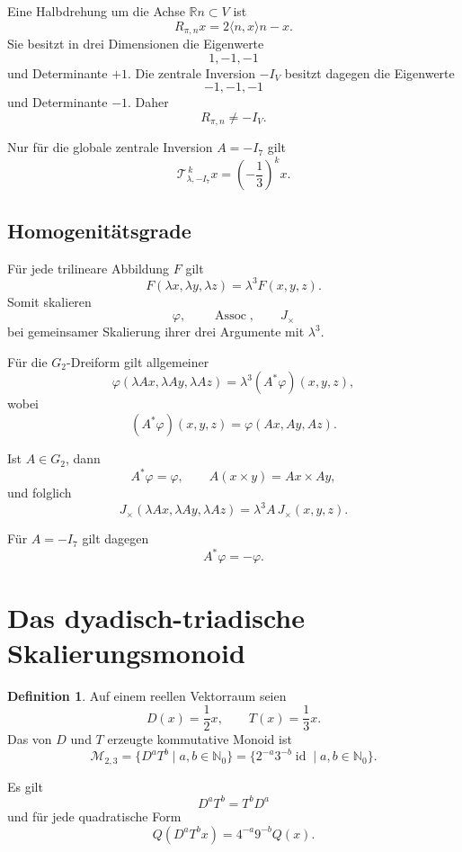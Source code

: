 \documentclass[11pt,a4paper]{article}
\theoremstyle{definition}
\newtheorem{definition}[theorem]{Definition}
\newcommand{\Assoc}{\operatorname{Assoc}}
\newcommand{\MtwoThree}{\mathcal M_{2,3}}
\newcommand{\R}{\mathbb R}
\newcommand{\Nzero}{\mathbb N_0}
\newcommand{\id}{\operatorname{id}}
\begin{document}
Eine Halbdrehung um die Achse $\R n\subset V$ ist
\[
R_{\pi,n}x
=
2\langle n,x\rangle n-x.
\]
Sie besitzt in drei Dimensionen die Eigenwerte
\[
1,-1,-1
\]
und Determinante $+1$. Die zentrale Inversion $-I_V$ besitzt dagegen die Eigenwerte
\[
-1,-1,-1
\]
und Determinante $-1$. Daher
\[
R_{\pi,n}\neq -I_V.
\]

Nur für die globale zentrale Inversion $A=-I_7$ gilt
\[
\mathcal T_{\lambda,-I_7}^{\,k}x
=
\left(-\frac13\right)^kx.
\]

\subsection{Homogenitätsgrade}

Für jede trilineare Abbildung $F$ gilt
\[
F(\lambda x,\lambda y,\lambda z)
=
\lambda^3F(x,y,z).
\]
Somit skalieren
\[
\varphi,\qquad \Assoc,\qquad J_\times
\]
bei gemeinsamer Skalierung ihrer drei Argumente mit $\lambda^3$.

Für die $G_2$-Dreiform gilt allgemeiner
\begin{equation}
\varphi(\lambda Ax,\lambda Ay,\lambda Az)
=
\lambda^3(A^*\varphi)(x,y,z),
\end{equation}
wobei
\[
(A^*\varphi)(x,y,z)
=
\varphi(Ax,Ay,Az).
\]

Ist $A\in G_2$, dann
\[
A^*\varphi=\varphi,
\qquad
A(x\times y)=Ax\times Ay,
\]
und folglich
\[
J_\times(\lambda Ax,\lambda Ay,\lambda Az)
=
\lambda^3A\,J_\times(x,y,z).
\]

Für $A=-I_7$ gilt dagegen
\[
A^*\varphi=-\varphi.
\]

\section{Das dyadisch-triadische Skalierungsmonoid}

\begin{definition}
Auf einem reellen Vektorraum seien
\[
D(x)=\frac12x,
\qquad
T(x)=\frac13x.
\]
Das von $D$ und $T$ erzeugte kommutative Monoid ist
\begin{equation}
\MtwoThree
=
\{D^aT^b\mid a,b\in\Nzero\}
=
\{2^{-a}3^{-b}\id\mid a,b\in\Nzero\}.
\label{eq:monoid}
\end{equation}
\end{definition}

Es gilt
\[
D^aT^b=T^bD^a
\]
und für jede quadratische Form
\begin{equation}
Q(D^aT^bx)
=
4^{-a}9^{-b}Q(x).
\label{eq:monoid-q}
\end{equation}
\end{document}

